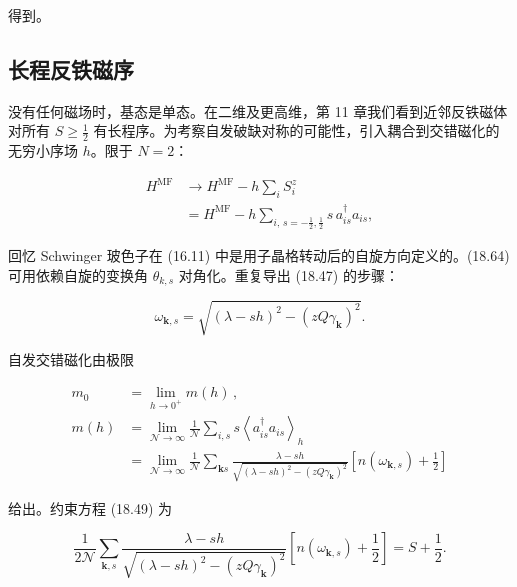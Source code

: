 得到。

\subsection{长程反铁磁序}

没有任何磁场时，基态是单态。在二维及更高维，第 11 章我们看到近邻反铁磁体对所有 $S \geq \frac{1}{2}$ 有长程序。为考察自发破缺对称的可能性，引入耦合到交错磁化的无穷小序场 $h$。限于 $N = 2$：

\begin{align*}
H ^ {\mathrm{MF}} & \rightarrow H ^ {\mathrm{MF}} - h \sum_ {i} S _ {i} ^ {z}\\
& = H ^ {\mathrm{MF}} - h \sum_{i, \, s = - \frac {1}{2}, \frac {1}{2}} s \, a _ {is} ^ {\dagger} a _ {is} ,
\tag{18.64}
\end{align*}

回忆 Schwinger 玻色子在 (16.11) 中是用子晶格转动后的自旋方向定义的。(18.64) 可用依赖自旋的变换角 $\theta_{k,s}$ 对角化。重复导出 (18.47) 的步骤：

\begin{equation*}
\omega_{\mathbf {k}, s} = \sqrt { \left( \lambda - s h \right) ^ {2} - \left( z Q \gamma_{\mathbf {k}} \right) ^ {2} }.
\tag{18.65}
\end{equation*}

自发交错磁化由极限

\begin{align*}
m _ {0} & = \lim_{h \to 0 ^ {+}} m ( h ) \, ,\\
m ( h ) & = \lim_{\mathcal {N} \to \infty} \frac {1}{\mathcal {N}} \sum_{i, s} s \left\langle a _ {is} ^ {\dagger} a _ {is} \right\rangle_{h}\\
& = \lim_{\mathcal {N} \to \infty} \frac {1}{\mathcal {N}} \sum_{\mathbf {k} s} \frac {\lambda - s h}{\sqrt { \left( \lambda - s h \right) ^ {2} - \left( z Q \gamma_{\mathbf {k}} \right) ^ {2} }} \left[ n \left( \omega_{\mathbf {k}, s} \right) + \frac {1}{2} \right]
\tag{18.66}
\end{align*}

给出。约束方程 (18.49) 为

\begin{equation*}
\frac {1}{2 \mathcal {N}} \sum_{\mathbf {k}, s} \frac {\lambda - s h}{\sqrt { \left( \lambda - s h \right) ^ {2} - \left( z Q \gamma_{\mathbf {k}} \right) ^ {2} }} \left[ n \left( \omega_{\mathbf {k}, s} \right) + \frac {1}{2} \right] = S + \frac {1}{2}.
\tag{18.67}
\end{equation*}

